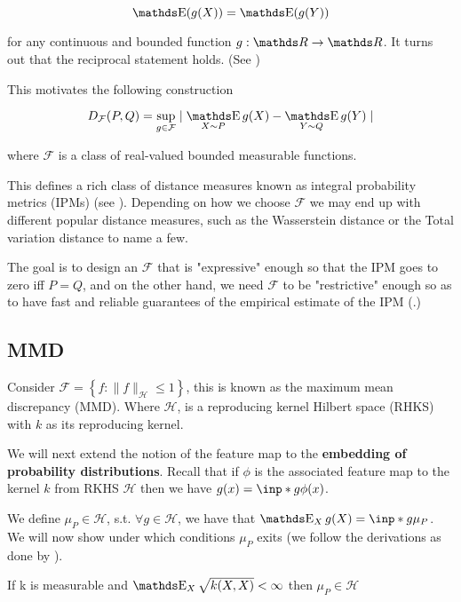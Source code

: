 $$
\E(g(X)) = \E(g(Y))
$$

for any continuous and bounded function $g : \R \rightarrow \R$. 
It turns out that the reciprocal statement holds. (See \cite{TwoSampleTestGrettonBernhard})

This motivates the following construction

$$
D_\mathcal{F} (P, Q) = 
\sup _{g \in \mathcal{F}} \mid \mathop{\E}_{X \sim P} g(X) - \mathop{\E}_{Y \sim Q} g(Y) \mid
$$

where $\mathcal{F}$ is a class of real-valued bounded measurable functions.


This defines a rich class of distance measures known as 
integral probability metrics (IPMs) (see \cite{muller1997integral}). Depending
on how we choose $\mathcal{F}$ we may end up with different popular distance measures, such as
the Wasserstein distance or the Total variation distance to name a few. 

The goal is to design an $\mathcal{F}$ that is "expressive" enough so that the IPM goes to zero iff $P = Q$,
and on the other hand, we need $\mathcal{F}$ to be "restrictive" enough so as to have fast and 
reliable guarantees of the empirical estimate of the IPM (\cite{TwoSampleTestGrettonBernhard}.)


\subsection{MMD}

Consider $\mathcal{F}=\left\{f:\|f\|_{\mathcal{H}} \leq 1\right\}$, this is known
as the maximum mean discrepancy (MMD). Where $\mathcal{H}$, is a reproducing kernel Hilbert space 
(RHKS) with $k$ as its reproducing kernel. 

We will next extend the notion of the feature map to the \textbf{embedding of probability distributions}. 
Recall that if $\phi$ is the associated feature map to the kernel $k$ from 
RKHS $\mathcal{H}$ then we have $g(x) = \inp*{g}{\phi(x)}$.

We define $\mu_P \in \mathcal{H}$, s.t. $\forall g \in \mathcal{H}$, we have that
$\mathop{\E}_{X} g(X) = \inp*{g}{\mu_P}$. We will now show under which conditions $\mu_P$ exits
(we follow the derivations as done by \cite{Peters2008diploma}).

\begin{lemma}\label{embedding_existance}
    If k is measurable and $\mathop{\E}_{X} \sqrt{k(X, X)} < \infty$ then
    $\mu_P \in \mathcal{H}$
\end{lemma}


